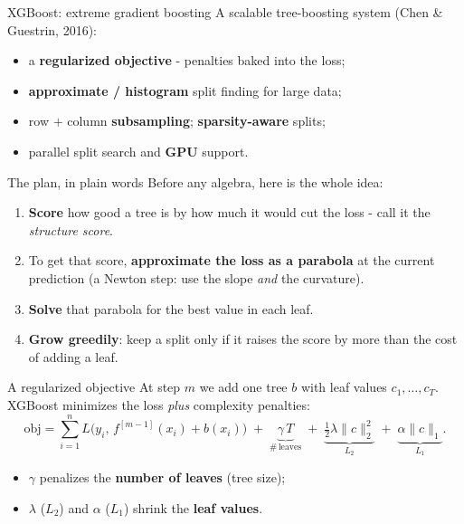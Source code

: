 \documentclass[aspectratio=169]{beamer}
\begin{document}
\begin{frame}{XGBoost: extreme gradient boosting}
  A scalable tree-boosting system (Chen \& Guestrin, 2016):
  \begin{itemize}
    \item a \textbf{regularized objective} - penalties baked into the loss;
    \item \textbf{approximate / histogram} split finding for large data;
    \item row $+$ column \textbf{subsampling}; \textbf{sparsity-aware} splits;
    \item parallel split search and \textbf{GPU} support.
  \end{itemize}
  \vfill
\end{frame}

\begin{frame}{The plan, in plain words}
  Before any algebra, here is the whole idea:
  \begin{enumerate}
    \item \textbf{Score} how good a tree is by how much it would cut the loss - call it the
      \emph{structure score}.
    \item To get that score, \textbf{approximate the loss as a parabola} at the current prediction
      (a Newton step: use the slope \emph{and} the curvature).
    \item \textbf{Solve} that parabola for the best value in each leaf.
    \item \textbf{Grow greedily}: keep a split only if it raises the score by more than the cost of
      adding a leaf.
  \end{enumerate}
  \vfill
\end{frame}

\begin{frame}{A regularized objective}
  At step $m$ we add one tree $b$ with leaf values $c_1,\dots,c_T$. XGBoost minimizes the loss
  \emph{plus} complexity penalties:
  \[
    \mathrm{obj} = \sum_{i=1}^{n} L\big(y_i,\, f^{[m-1]}(x_i) + b(x_i)\big)
      \;+\; \underbrace{\gamma\,T}_{\#\,\text{leaves}}
      \;+\; \underbrace{\tfrac12 \lambda \|c\|_2^2}_{L_2}
      \;+\; \underbrace{\alpha \|c\|_1}_{L_1}.
  \]
  \begin{itemize}\small
    \item $\gamma$ penalizes the \textbf{number of leaves} (tree size);
    \item $\lambda$ ($L_2$) and $\alpha$ ($L_1$) shrink the \textbf{leaf values}.
  \end{itemize}
  \vfill
\end{frame}
\end{document}
